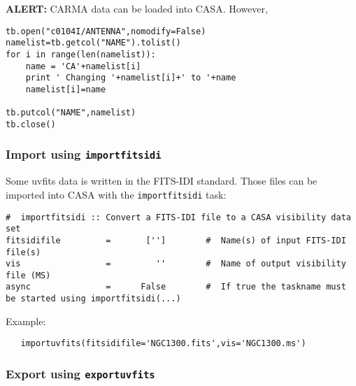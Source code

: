 {\bf ALERT:} CARMA data can be loaded into CASA. However,
 
\begin{verbatim}
tb.open("c0104I/ANTENNA",nomodify=False)
namelist=tb.getcol("NAME").tolist()
for i in range(len(namelist)):
	name = 'CA'+namelist[i]
	print ' Changing '+namelist[i]+' to '+name
	namelist[i]=name
 
tb.putcol("NAME",namelist)
tb.close()
\end{verbatim}

\subsubsection{Import using {\tt importfitsidi} }
\label{section:io.import.uvfitsidi.import}

Some uvfits data is written in the FITS-IDI standard. Those files can
be imported into CASA with the {\tt importfitsidi} task: 
\small
\begin{verbatim}
#  importfitsidi :: Convert a FITS-IDI file to a CASA visibility data set
fitsidifile         =       ['']        #  Name(s) of input FITS-IDI file(s)
vis                 =         ''        #  Name of output visibility file (MS)
async               =      False        #  If true the taskname must be started using importfitsidi(...)
\end{verbatim}
\normalsize

Example:
\small
\begin{verbatim}
   importuvfits(fitsidifile='NGC1300.fits',vis='NGC1300.ms')
\end{verbatim}
\normalsize



\subsubsection{Export using {\tt exportuvfits} }
\label{section:io.import.uvfits.export}

